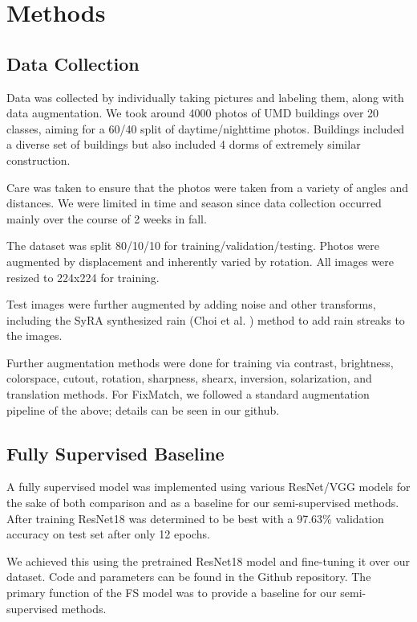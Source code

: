\documentclass{article}
\begin{document}
\section{Methods}
\label{method}

\subsection{Data Collection}

Data was collected by individually taking pictures and labeling them, along with data augmentation. We took around 4000 photos of UMD buildings over 20 classes, aiming for a 60/40 split of daytime/nighttime photos. Buildings included a diverse set of buildings but also included 4 dorms of extremely similar construction.

Care was taken to ensure that the photos were taken from a variety of angles and distances. We were limited in time and season since data collection occurred mainly over the course of 2 weeks in fall. 


The dataset was split 80/10/10 for training/validation/testing. Photos were augmented by displacement and inherently varied by rotation. All images were resized to 224x224 for training. 

Test images were further augmented by adding noise and other transforms, including the SyRA synthesized rain (Choi et al. \cite{choi}) method to add rain streaks to the images. 

Further augmentation methods were done for training via contrast, brightness, colorspace, cutout, rotation, sharpness, shearx, inversion, solarization, and translation methods. For FixMatch, we followed a standard augmentation pipeline of the above; details can be seen in our github.

\subsection{Fully Supervised Baseline}

A fully supervised model was implemented using various ResNet/VGG models for the sake of both comparison and as a baseline for our semi-supervised methods. After training ResNet18 was determined to be best with a 97.63\% validation accuracy on test set after only 12 epochs. 

We achieved this using the pretrained ResNet18 model and fine-tuning it over our dataset. Code and parameters can be found in the Github repository. The primary function of the FS model was to provide a baseline for our semi-supervised methods.
\end{document}
